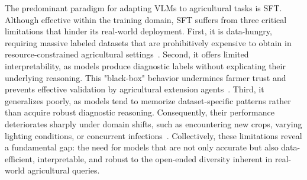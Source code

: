 \documentclass[sigconf,anonymous,review]{acmart}
\begin{document}


The predominant paradigm for adapting VLMs to agricultural tasks is SFT. Although effective within the training domain, SFT suffers from three critical limitations that hinder its real-world deployment. First, it is data-hungry, requiring massive labeled datasets that are prohibitively expensive to obtain in resource-constrained agricultural settings~\cite{liu2024multimodal}. Second, it offers limited interpretability, as models produce diagnostic labels without explicating their underlying reasoning. This "black-box" behavior undermines farmer trust and prevents effective validation by agricultural extension agents~\cite{zhi2025medgr,chu2025sft}. Third, it generalizes poorly, as models tend to memorize dataset-specific patterns rather than acquire robust diagnostic reasoning. Consequently, their performance deteriorates sharply under domain shifts, such as encountering new crops, varying lighting conditions, or concurrent infections~\cite{pan2025medvlm,wu2023laboratory,nanavaty2024integrating,chen2025sft}. Collectively, these limitations reveal a fundamental gap: the need for models that are not only accurate but also data-efficient, interpretable, and robust to the open-ended diversity inherent in real-world agricultural queries.
\end{document}
